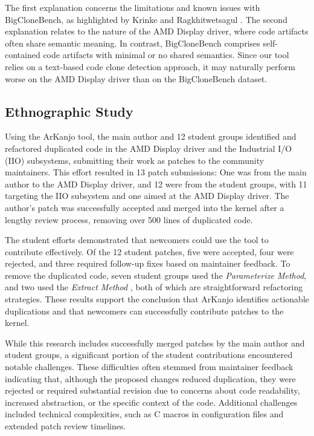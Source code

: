 \documentclass[conference]{IEEEtran}
\begin{document}
The first explanation concerns the limitations and known issues with BigCloneBench, as
highlighted by Krinke and Ragkhitwetsagul \cite{bigfail}. The
second explanation relates to the nature of the AMD Display driver, where code artifacts
often share semantic meaning. In contrast, BigCloneBench comprises self-contained code
artifacts with minimal or no shared semantics. Since our tool relies on a text-based code clone
detection approach, it may naturally perform worse on the AMD Display driver than on the
BigCloneBench dataset.

\subsection{Ethnographic Study}

Using the ArKanjo tool, the main author and 12 student groups identified and refactored duplicated 
code in the AMD Display driver and the Industrial I/O (IIO) subsystems, submitting their work 
as patches to the community maintainers. This effort resulted in 13 patch submissions: 
One was from the main author to the AMD Display driver, and 12 were from the student groups, with 11 targeting 
the IIO subsystem and one aimed at the AMD Display driver. The author's patch was successfully accepted and merged into the kernel after a 
lengthy review process, removing over 
500 lines of duplicated code.

The student efforts demonstrated that newcomers could use the tool to contribute effectively. 
Of the 12 student patches, five were accepted, four were rejected, and three required follow-up 
fixes based on maintainer feedback. To remove the duplicated code, seven student groups used the 
\textit{Parameterize Method}, and two used the \textit{Extract Method} \cite{refactorbook}, both of which are 
straightforward refactoring strategies. These results support the conclusion that ArKanjo identifies 
actionable duplications and that newcomers can successfully contribute patches to the kernel.

While this research includes successfully merged patches by the main author and student groups,
a significant portion of the student contributions encountered notable challenges. These difficulties 
often stemmed from maintainer feedback indicating that, although the proposed changes reduced duplication, 
they were rejected or required substantial revision due to concerns about code readability, increased abstraction, 
or the specific context of the code. Additional challenges included technical complexities, such as C macros in 
configuration files and extended patch review timelines. 
\end{document}
